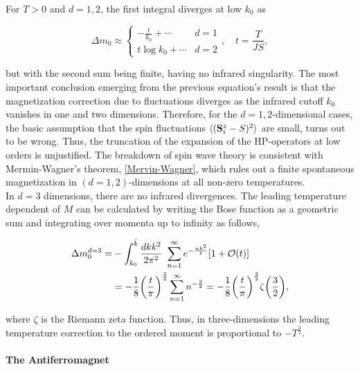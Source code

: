\documentclass{homework}
\begin{document}
For $T > 0$ and $d = 1,2$, the first integral diverges at low $k_0$ as 

\begin{equation}
    \Delta m_0 \approx \left\{ \begin{array}{cc}
        -\frac{t}{k_0} + \cdots & d=1 \\
        t \log k_0 + \cdots & d=2
    \end{array}\right., \quad t = \frac{T}{JS},
\end{equation}

but with the second sum being finite, having no infrared singularity. The most 
important conclusion emerging from the previous equation's result is that the 
magnetization correction due to fluctuations diverges as the infrared cutoff 
$k_0$ vanishes in one and two dimensions. Therefore, for the $d=1,2$-dimensional cases, the basic assumption that the spin fluctuations $\langle ({\bf S}_i^z - 
S)^2 \rangle$ are small, turns out to be wrong. Thus, the truncation of the 
expansion of the HP-operators at low orders is unjustified. The breakdown of 
spin wave theory is consistent with Mermin-Wagner's theorem, \cref{Mervin-Wagner}, which rules out a finite spontaneous magnetization in $(d=1,2)$-dimensions at all non-zero temperatures. \\

In $d = 3$ dimensions, there are no infrared divergences. The leading temperature dependent of $M$ can be calculated by writing the Bose function as a geometric sum and integrating over momenta up to infinity as follows, 

\begin{equation}
\begin{split}
    \Delta m_0^{d=3} =& - \int_{k_0}^{\bar{k}} \frac{dk k^2}{2\pi^2} \textnormal{ } \sum_{n=1}^{\infty} e^{-\frac{nk^2}{t}} [1+\mathcal{O}(t)] \\
    &= - \frac{1}{8} \bigg( \frac{t}{\pi} \bigg)^{\frac{3}{2}} \sum_{n=1}^{\infty} n^{-\frac{3}{2}} =  - \frac{1}{8} \bigg( \frac{t}{\pi} \bigg)^{\frac{3}{2}} \zeta\bigg(\frac{3}{2}\bigg),
\end{split}
\end{equation}

where $\zeta$ is the Riemann zeta function. Thus, in three-dimensions the leading temperature correction to the ordered moment is proportional to $-T^{\frac{3}{2}}$. \\

\paragraph{The Antiferromagnet}
\end{document}
